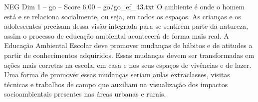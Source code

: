 \begin{textsample}{NEG Dim 1 – go – Score 6.00 – go/go\_ef\_43.txt}
O ambiente é onde o homem está e se relaciona socialmente, ou seja, em todos os espaços.
As crianças e os adolescentes precisam dessa visão integrada para se sentirem parte da natureza, assim o processo de educação ambiental acontecerá de forma mais real.
A Educação Ambiental Escolar deve promover mudanças de hábitos e de atitudes a partir de conhecimentos adquiridos.
Essas mudanças devem ser transformadas em ações mais corretas na escola, em casa e nos seus espaços de vivências e de lazer.
Uma forma de promover essas mudanças seriam aulas extraclasses, visitas técnicas e trabalhos de campo que auxiliam na visualização dos impactos socioambientais presentes nas áreas urbanas e rurais.

\end{textsample}
